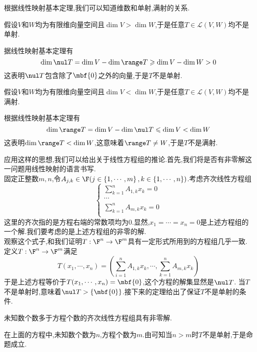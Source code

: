 \documentclass{ctexart}
\begin{document}
根据线性映射基本定理,我们可以知道维数和单射,满射的关系.
\begin{formal}[3.2 映射到更低维空间上的线性映射不是单射]
    假设$V$和$W$均为有限维向量空间且$\dim V>\dim W$,于是任意$T\in\mathcal{L}(V,W)$均不是单射.
\end{formal}
\begin{solution}[Proof.]
    据线性映射基本定理有
    $$\dim\nul T=\dim V-\dim\range T\geqslant\dim V-\dim W>0$$
    这表明$\nul T$包含除了$\mbf{0}$之外的向量,于是$T$不是单射.
\end{solution}
\begin{formal}[3.3 映射到更高维空间上的线性映射不是满射]
    假设$V$和$W$均为有限维向量空间且$\dim V<\dim W$,于是任意$T\in\mathcal{L}(V,W)$均不是满射.
\end{formal}
\begin{solution}[Proof.]
    根据线性映射基本定理有
    $$\dim\range T=\dim V-\dim\nul T\leqslant\dim V<\dim W$$
    这表明$\dim\range T<\dim W$,这意味着$\range T\neq W$,于是$T$不是满射.
\end{solution}\noindent
应用这样的思想,我们可以给出关于线性方程组的推论.首先,我们将是否有非零解这一问题用线性映射的语言书写.\\
固定正整数$m,n$,令$A_{j,k}\in\F(j\in\left\{1,\cdots,m\right\},k\in\left\{1,\cdots,n\right\})$.考虑齐次线性方程组
$$\left\{\begin{array}{l}
    \displaystyle\sum_{k=1}^{n}A_{1,k}x_k=0\\
    \cdots\\
    \displaystyle\sum_{k=1}^{n}A_{m,k}x_k=0\\
\end{array}\right.$$
这里的齐次指的是方程右端的常数项均为$0$.显然,$x_1=\cdots=x_n=0$是上述方程组的一个解.我们要考虑的是上述方程组的非零的解.\\
观察这个式子,和我们证明$T:\F^n\to\F^m$具有一定形式所用到的方程组几乎一致.定义$T:\F^n\to\F^m$满足
$$T(x_1,\cdots,x_n)=\left(\sum_{i=1}^{n}A_{1,k}x_k,\cdots,\sum_{k=1}^{n}A_{m,k}x_k\right)$$
于是上述方程等价于$T(x_1,\cdots,x_n)=\mbf{0}$,这个方程的解集显然是$\nul T$.
当$T$不是单射时,意味着$\nul T>\left\{\mbf{0}\right\}$.接下来的定理给出了保证$T$不是单射的条件.
\begin{formal}[3.4 齐次线性方程组具有非零解的条件]
    未知数个数多于方程个数的齐次线性方程组具有非零解.
\end{formal}\noindent
在上面的方程中,未知数个数为$n$,方程个数为$m$.由可知当$n>m$时$T$不是单射,于是命题成立.\\
\end{document}
